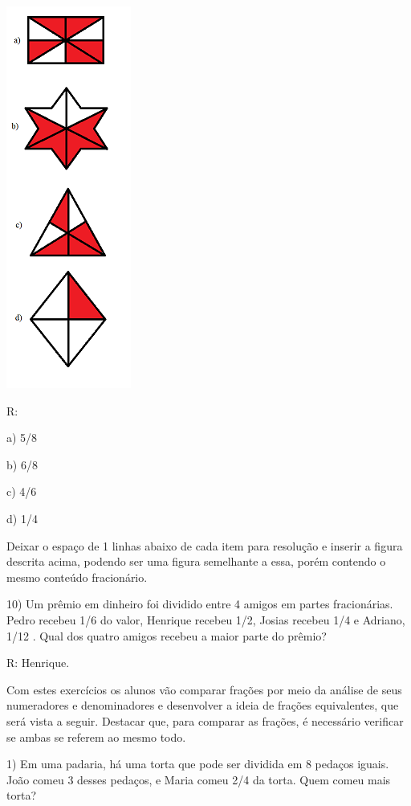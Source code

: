 \includegraphics[width=1.61458in,height=4.94792in]{./imgSAEB_6_MAT/media/image34.png}

R:

a) 5/8

b) 6/8

c) 4/6

d) 1/4

Deixar o espaço de 1 linhas abaixo de cada item para resolução e inserir
a figura descrita acima, podendo ser uma figura semelhante a essa, porém
contendo o mesmo conteúdo fracionário.

10) Um prêmio em dinheiro foi dividido entre 4 amigos em partes
fracionárias. Pedro recebeu 1/6 do valor, Henrique recebeu 1/2, Josias
recebeu 1/4 e Adriano, 1/12 . Qual dos quatro amigos recebeu a maior
parte do prêmio?

R: Henrique.

Com estes exercícios os alunos vão comparar frações por meio da análise
de seus numeradores e denominadores e desenvolver a ideia de frações
equivalentes, que será vista a seguir. Destacar que, para comparar as
frações, é necessário verificar se ambas se referem ao mesmo todo.


1) Em uma padaria, há uma torta que pode ser dividida em 8 pedaços
iguais. João comeu 3 desses pedaços, e Maria comeu 2/4 da torta. Quem
comeu mais torta?

